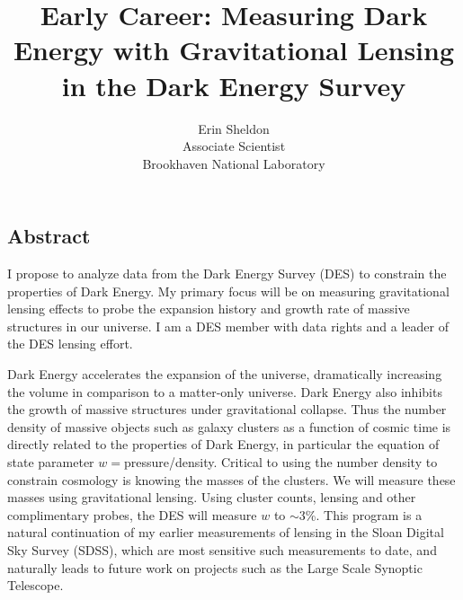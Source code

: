 \documentclass[12pt]{article}
\begin{document}
\newpage 



\tableofcontents


\newpage

\title{Early Career: Measuring Dark Energy with Gravitational Lensing in 
the Dark Energy Survey}
\author{Erin Sheldon\\
{\normalsize Associate Scientist}\\
\normalsize{Brookhaven National Laboratory}}
\date{}
\maketitle



\begin{center}
\section*{Abstract}
\end{center}


I propose to analyze data from the Dark Energy Survey (DES) to constrain the
properties of Dark Energy.  My primary focus will be on measuring gravitational
lensing effects to probe the expansion history and growth rate of massive
structures in our universe.  I am a DES member with data rights and a leader of
the DES lensing effort.

Dark Energy accelerates the expansion of the universe, dramatically increasing
the volume in comparison to a matter-only universe.  Dark Energy also inhibits
the growth of massive structures under gravitational collapse.  Thus the number
density of massive objects such as galaxy clusters as a function of cosmic time
is directly related to the properties of Dark Energy, in particular the
equation of state parameter $w=$pressure/density.  Critical to using the number
density to constrain cosmology is knowing the masses of the clusters. We will
measure these masses using gravitational lensing.  Using cluster counts,
lensing and other complimentary probes, the DES will measure $w$ to $\sim$3\%.
This program is a natural continuation of my earlier measurements of lensing in
the Sloan Digital Sky Survey (SDSS), which are most sensitive such measurements
to date, and naturally leads to future work on projects such as the Large Scale
Synoptic Telescope\cite{lsstweb}.
\end{document}
